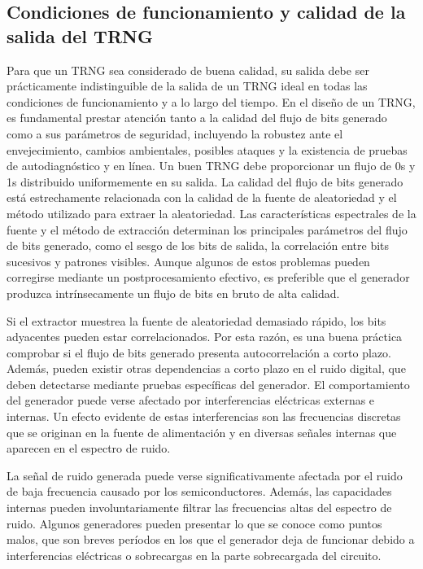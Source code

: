         \subsection{Condiciones de funcionamiento y calidad de la salida del TRNG}

            Para que un TRNG sea considerado de buena calidad, su salida debe ser prácticamente indistinguible de la salida de un TRNG ideal en todas las condiciones de funcionamiento y a lo largo del tiempo. En el diseño de un TRNG, es fundamental prestar atención tanto a la calidad del flujo de bits generado como a sus parámetros de seguridad, incluyendo la robustez ante el envejecimiento, cambios ambientales, posibles ataques y la existencia de pruebas de autodiagnóstico y en línea.
            Un buen TRNG debe proporcionar un flujo de 0s y 1s distribuido uniformemente en su salida. La calidad del flujo de bits generado está estrechamente relacionada con la calidad de la fuente de aleatoriedad y el método utilizado para extraer la aleatoriedad. Las características espectrales de la fuente y el método de extracción determinan los principales parámetros del flujo de bits generado, como el sesgo de los bits de salida, la correlación entre bits sucesivos y patrones visibles. Aunque algunos de estos problemas pueden corregirse mediante un postprocesamiento efectivo, es preferible que el generador produzca intrínsecamente un flujo de bits en bruto de alta calidad.

            Si el extractor muestrea la fuente de aleatoriedad demasiado rápido, los bits adyacentes pueden estar correlacionados. Por esta razón, es una buena práctica comprobar si el flujo de bits generado presenta autocorrelación a corto plazo. Además, pueden existir otras dependencias a corto plazo en el ruido digital, que deben detectarse mediante pruebas específicas del generador. El comportamiento del generador puede verse afectado por interferencias eléctricas externas e internas. Un efecto evidente de estas interferencias son las frecuencias discretas que se originan en la fuente de alimentación y en diversas señales internas que aparecen en el espectro de ruido.

            La señal de ruido generada puede verse significativamente afectada por el ruido de baja frecuencia causado por los semiconductores. Además, las capacidades internas pueden involuntariamente filtrar las frecuencias altas del espectro de ruido. Algunos generadores pueden presentar lo que se conoce como puntos malos, que son breves períodos en los que el generador deja de funcionar debido a interferencias eléctricas o sobrecargas en la parte sobrecargada del circuito.


